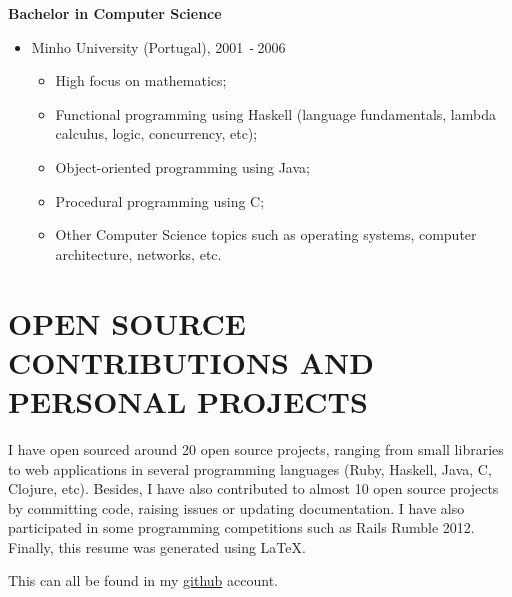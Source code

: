\documentclass{res}
\def\Minus{\texttt{-}\,}
\begin{document}
\begin{resume}
    {\bf Bachelor in Computer Science}
    \begin{itemize}
      \item[] Minho University (Portugal), 2001 \Minus 2006
      \begin{itemize}
        \item High focus on mathematics;
        \item Functional programming using Haskell (language fundamentals, lambda calculus, logic, concurrency, etc);
        \item Object-oriented programming using Java;
        \item Procedural programming using C;
        \item Other Computer Science topics such as operating systems, computer architecture, networks, etc.
      \end{itemize}
    \end{itemize}

\section{OPEN SOURCE CONTRIBUTIONS AND PERSONAL PROJECTS}
\vspace{0.1in}

    I have open sourced around 20 open source projects, ranging from small libraries to web applications in several programming languages (Ruby, Haskell, Java, C, Clojure, etc). Besides, I have also contributed to almost 10 open source projects by committing code, raising issues or updating documentation. I have also participated in some programming competitions such as Rails Rumble 2012. Finally, this resume was generated using LaTeX.

    This can all be found in my \href{http://github.com/carvil}{github} account.

\end{resume}
\end{document}
